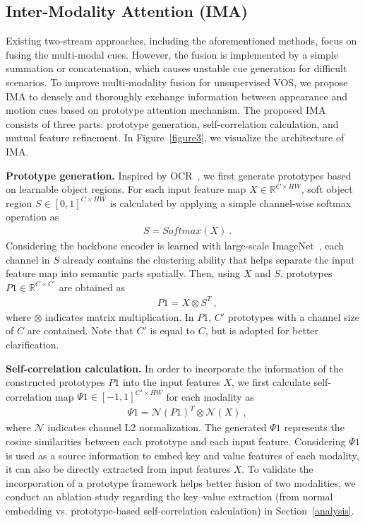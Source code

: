 \documentclass[10pt,twocolumn,letterpaper]{article}
\begin{document}
\subsection{Inter-Modality Attention (IMA)}
\label{IMA}
Existing two-stream approaches, including the aforementioned methods, focus on fusing the multi-modal cues. However, the fusion is implemented by a simple summation or concatenation, which causes unstable cue generation for difficult scenarios. To improve multi-modality fusion for unsupervised VOS, we propose IMA to densely and thoroughly exchange information between appearance and motion cues based on prototype attention mechanism. The proposed IMA consists of three parts: prototype generation, self-correlation calculation, and mutual feature refinement. In Figure~\ref{figure3}, we visualize the architecture of IMA.


\vspace{1mm}
\noindent\textbf{Prototype generation.} Inspired by OCR~\cite{OCR}, we first generate prototypes based on learnable object regions. For each input feature map $X \in \mathbb{R}^{C\times HW}$, soft object region $S \in [0, 1]^{C\times HW}$ is calculated by applying a simple channel-wise softmax operation as
\begin{align}
&S = Softmax(X)~.
\end{align}
Considering the backbone encoder is learned with large-scale ImageNet~\cite{imagenet}, each channel in $S$ already contains the clustering ability that helps separate the input feature map into semantic parts spatially. Then, using $X$ and $S$, prototypes $P1 \in \mathbb{R}^{C \times C'}$ are obtained as
\begin{align}
&P1 = X \otimes S^{T}~,
\end{align}
where $\otimes$ indicates matrix multiplication. In $P1$, $C'$ prototypes with a channel size of $C$ are contained. Note that $C'$ is equal to $C$, but is adopted for better clarification. 



\vspace{1mm}
\noindent\textbf{Self-correlation calculation.} In order to incorporate the information of the constructed prototypes $P1$ into the input features $X$, we first calculate self-correlation map $\Psi1 \in [-1, 1]^{C'\times HW}$ for each modality as
\begin{align}
&\Psi1 = \mathcal{N}(P1)^{T} \otimes \mathcal{N}(X)~,
\end{align}
where $\mathcal{N}$ indicates channel L2 normalization. The generated $\Psi1$ represents the cosine similarities between each prototype and each input feature. Considering $\Psi1$ is used as a source information to embed key and value features of each modality, it can also be directly extracted from input features $X$. To validate the incorporation of a prototype framework helps better fusion of two modalities, we conduct an ablation study regarding the  key--value extraction (from normal embedding vs. prototype-based self-correlation calculation) in Section~\ref{analysis}.
\end{document}
